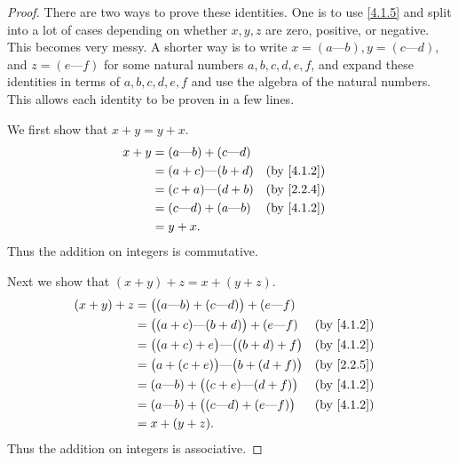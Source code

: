 \begin{proof}
  There are two ways to prove these identities.
  One is to use \cref{4.1.5} and split into a lot of cases depending on whether \(x, y, z\) are zero, positive, or negative.
  This becomes very messy.
  A shorter way is to write \(x = (a \text{---} b), y = (c \text{---} d)\), and \(z = (e \text{---} f)\) for some natural numbers \(a, b, c, d, e, f\), and expand these identities in terms of \(a, b, c, d, e, f\) and use the algebra of the natural numbers.
  This allows each identity to be proven in a few lines.

  We first show that \(x + y = y + x\).
  \begin{align*}
    x + y & = (a \text{---} b) + (c \text{---} d) &                              \\
          & = (a + c) \text{---} (b + d)          &   & \text{(by \cref{4.1.2})} \\
          & = (c + a) \text{---} (d + b)          &   & \text{(by \cref{2.2.4})} \\
          & = (c \text{---} d) + (a \text{---} b) &   & \text{(by \cref{4.1.2})} \\
          & = y + x.
  \end{align*}
  Thus the addition on integers is commutative.

  Next we show that \((x + y) + z = x + (y + z)\).
  \begin{align*}
    (x + y) + z & = \big((a \text{---} b) + (c \text{---} d)\big) + (e \text{---} f)                               \\
                & = \big((a + c) \text{---} (b + d)\big) + (e \text{---} f)          &  & \text{(by \cref{4.1.2})} \\
                & = \big((a + c) + e\big) \text{---} \big((b + d) + f\big)           &  & \text{(by \cref{4.1.2})} \\
                & = \big(a + (c + e)\big) \text{---} \big(b + (d + f)\big)           &  & \text{(by \cref{2.2.5})} \\
                & = (a \text{---} b) + \big((c + e) \text{---} (d + f)\big)          &  & \text{(by \cref{4.1.2})} \\
                & = (a \text{---} b) + \big((c \text{---} d) + (e \text{---} f)\big) &  & \text{(by \cref{4.1.2})} \\
                & = x + (y + z).
  \end{align*}
  Thus the addition on integers is associative.


\end{proof}
